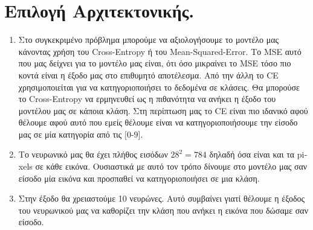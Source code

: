 \documentclass[12pt,a4paper]{article}
\newcommand{\tl}{\textlatin}
\begin{document}
    \section{Επιλογή Αρχιτεκτονικής.}

    \begin{enumerate}[a]
        \item Στο συγκεκριμένο πρόβλημα μπορούμε να αξιολογήσουμε το μοντέλο μας κάνοντας χρήση του \tl{Cross-Entropy} ή του \tl{Mean-Squared-Error}. Το \tl{MSE} αυτό που μας δείχνει για το μοντέλο μας είναι, ότι όσο μικραίνει το \tl{MSE} τόσο πιο κοντά είναι η έξοδο μας στο επιθυμητό αποτέλεσμα. Από την άλλη το \tl{CE} χρησιμοποιείται για να κατηγοριοποιήσει το δεδομένα σε κλάσεις. Θα μπορούσε το  \tl{Cross-Entropy} να ερμηνευθεί ως η πιθανότητα να ανήκει η έξοδο του μοντέλου μας σε κάποια κλάση. Στη περίπτωση μας το \tl{CE} είναι πιο ιδανικό αφού θέλουμε αφού αυτό που εμείς θέλουμε είναι να κατηγοριοποιήσουμε την είσοδο μας σε μία κατηγορία από τις $[0 $-$ 9]$.

        \item Το νευρωνικό μας θα έχει πλήθος εισόδων $ 28^2 = 784 $ δηλαδή όσα είναι και  τα \tl{pixels} σε κάθε εικόνα. Ουσιαστικά με αυτό τον τρόπο δίνουμε στο μοντέλο μας σαν είσοδο μία εικόνα και προσπαθεί να κατηγοριοποιήσει σε μια κλάση. 

        \item Στην έξοδο θα χρειαστούμε 10 νευρώνες.  Αυτό συμβαίνει γιατί θέλουμε η έξοδος του νευρωνικού μας να καθορίζει την κλάση που ανήκει η εικόνα που δώσαμε σαν είσοδο.


\end{enumerate}
\end{document}
